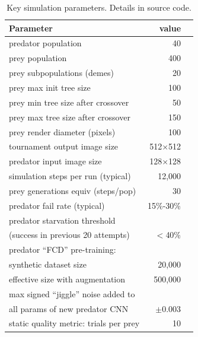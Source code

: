 \documentclass[letterpaper]{article}
\begin{document}
\begin{footnotesize}
\begin{table}[h]
    \centering
    \vspace{0.7cm}

    \begin{tabular}{ |l|r|r| }
        \hline
        \textbf{Parameter} & \textbf{value} \\ 
        \hline
        predator population & 40 \\ 
        prey population & 400 \\ 
        prey subpopulations (demes) & 20 \\
        prey max init tree size & 100 \\
        prey min tree size after crossover & 50 \\
        prey max tree size after crossover & 150 \\
        \hline
        prey render diameter (pixels) & 100 \\ 
        tournament output image size & 512$\times$512 \\ 
        predator input image size & 128$\times$128 \\ 
        \hline
        simulation steps per run (typical) & 12,000 \\
        prey generations equiv (steps/pop) & 30 \\
        predator fail rate (typical) & 15\%-30\% \\
        predator starvation threshold & \\
        \hspace{0.2cm}(success in previous 20 attempts) & $<$40\% \\ 
        \hline
        predator ``FCD'' pre-training: & \\
        \hspace{0.2cm} synthetic dataset size & 20,000 \\
        \hspace{0.2cm} effective size with augmentation & 500,000 \\
        \hline
        max signed ``jiggle'' noise added to  & \\
        \hspace{0.2cm} all params of new predator CNN & $\pm$0.003 \\
        \hline
        static quality metric: trials per prey & 10\\
        \hline
    \end{tabular}
    \caption{Key simulation parameters. Details in source code.}
    \label{table:key_simulation_parameters} 
\end{table}
\end{footnotesize}
\end{document}
